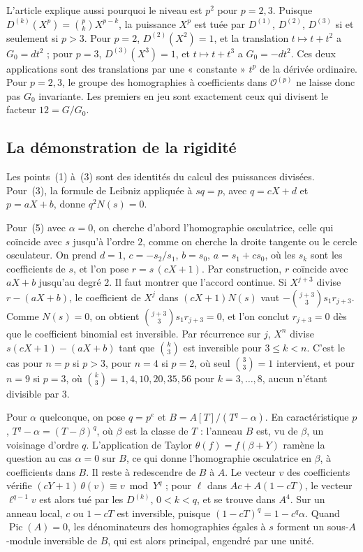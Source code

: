 \documentclass[11pt,a4paper]{amsart}
\theoremstyle{definition}
\theoremstyle{plain}
\theoremstyle{remark}
\theoremstyle{plain}
\begin{document}
L'article explique aussi pourquoi le niveau est $p^2$ pour $p = 2, 3$. Puisque $D^{(k)}(X^p) = \binom pk X^{p-k}$, la puissance $X^p$ est tuée par $D^{(1)}$, $D^{(2)}$, $D^{(3)}$ si et seulement si $p > 3$. Pour $p = 2$, $D^{(2)}(X^2) = 1$, et la translation $t \mapsto t + t^2$ a $G_0 = dt^2$ ; pour $p = 3$, $D^{(3)}(X^3) = 1$, et $t \mapsto t + t^3$ a $G_0 = -dt^2$. Ces deux applications sont des translations par une « constante » $t^p$ de la dérivée ordinaire. Pour $p = 2, 3$, le groupe des homographies à coefficients dans $\mathcal O^{(p)}$ ne laisse donc pas $G_0$ invariante. Les premiers en jeu sont exactement ceux qui divisent le facteur $12 = G/G_0$.

\subsection{La démonstration de la rigidité}

Les points~(1) à~(3) sont des identités du calcul des puissances divisées. Pour~(3), la formule de Leibniz appliquée à $sq = p$, avec $q = cX + d$ et $p = aX + b$, donne $q^2N(s) = 0$.

Pour~(5) avec $\alpha = 0$, on cherche d'abord l'homographie osculatrice, celle qui coïncide avec $s$ jusqu'à l'ordre $2$, comme on cherche la droite tangente ou le cercle osculateur. On prend $d = 1$, $c = -s_2/s_1$, $b = s_0$, $a = s_1 + cs_0$, où les $s_k$ sont les coefficients de $s$, et l'on pose $r = s\,(cX + 1)$. Par construction, $r$ coïncide avec $aX + b$ jusqu'au degré $2$. Il faut montrer que l'accord continue. Si $X^{j+3}$ divise $r - (aX + b)$, le coefficient de $X^j$ dans $(cX + 1)N(s)$ vaut $-\binom{j+3}{3}s_1r_{j+3}$. Comme $N(s) = 0$, on obtient $\binom{j+3}3 s_1 r_{j+3} = 0$, et l'on conclut $r_{j+3} = 0$ dès que le coefficient binomial est inversible. Par récurrence sur $j$, $X^n$ divise $s(cX + 1) - (aX + b)$ tant que $\binom k3$ est inversible pour $3 \le k < n$. C'est le cas pour $n = p$ si $p > 3$, pour $n = 4$ si $p = 2$, où seul $\binom33 = 1$ intervient, et pour $n = 9$ si $p = 3$, où $\binom k3 = 1, 4, 10, 20, 35, 56$ pour $k = 3, \dots, 8$, aucun n'étant divisible par $3$.

Pour $\alpha$ quelconque, on pose $q = p^e$ et $B = A[T]/(T^q - \alpha)$. En caractéristique $p$, $T^q - \alpha = (T - \beta)^q$, où $\beta$ est la classe de $T$ : l'anneau $B$ est, vu de $\beta$, un voisinage d'ordre $q$. L'application de Taylor $\theta(f) = f(\beta + Y)$ ramène la question au cas $\alpha = 0$ sur $B$, ce qui donne l'homographie osculatrice en $\beta$, à coefficients dans $B$. Il reste à redescendre de $B$ à $A$. Le vecteur $v$ des coefficients vérifie $(cY + 1)\,\theta(v) \equiv v \bmod Y^q$ ; pour $\ell$ dans $Ac + A(1 - cT)$, le vecteur $\ell^{q-1}v$ est alors tué par les $D^{(k)}$, $0 < k < q$, et se trouve dans $A^4$. Sur un anneau local, $c$ ou $1 - cT$ est inversible, puisque $(1 - cT)^q = 1 - c^q\alpha$. Quand $\operatorname{Pic}(A) = 0$, les dénominateurs des homographies égales à $s$ forment un sous-$A$-module inversible de $B$, qui est alors principal, engendré par une unité.
\end{document}
